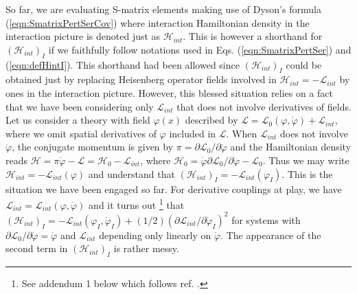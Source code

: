 
\indent

So far, we are evaluating S-matrix elements making use of Dyson's formula (\ref{eqn:SmatrixPertSerCov})
where interaction Hamiltonian density in the interaction picture is denoted just as $\mathcal{H}_{int}$.
This is however a shorthand for $(\mathcal{H}_{int})_I$ 
if we faithfully follow notations used in Eqs. (\ref{eqn:SmatrixPertSer}) and (\ref{eqn:defHintI}).
This shorthand had been allowed since $(\mathcal{H}_{int})_I$ 
could be obtained just by replacing Heisenberg operator fields involved in $\mathcal{H}_{int} = -\mathcal{L}_{int}$
by ones in the interaction picture.
However, this blessed situation relies on a fact that
we have been considering only $\mathcal{L}_{int}$
that does not involve derivatives of fields.
Let us consider
 a theory with field $\varphi (x)$ described by
$\mathcal{L} = \mathcal{L}_0 (\varphi, \dot{\varphi}) + \mathcal{L}_{int}$, where
we omit spatial derivatives of $\varphi$ included in $\mathcal{L}$.
When $\mathcal{L}_{int}$ does not involve $\dot{\varphi}$, 
the conjugate momentum is given by
$\pi = \partial \mathcal{L}_0 / \partial \dot{\varphi}$ and the Hamiltonian density reads
$\mathcal{H} = \pi \dot{\varphi} - \mathcal{L} = \mathcal{H}_0 - \mathcal{L}_{int}$, where
$\mathcal{H}_0 = \dot{\varphi} \partial \mathcal{L}_0 / \partial \dot{\varphi} - \mathcal{L}_0$.
Thus we may write $\mathcal{H}_{int} = -\mathcal{L}_{int} (\varphi)$ and
understand that $(\mathcal{H}_{int})_I =  -\mathcal{L}_{int} (\varphi_I)$.
This is the situation we have been engaged so far.
For derivative couplings at play, we have $\mathcal{L}_{int} = \mathcal{L}_{int} (\varphi, \dot{\varphi})$
and it turns out
\footnote{%
See addendum 1 below which follows ref. \cite{ref:NIsh.}.
}%
that
$(\mathcal{H}_{int})_I = -\mathcal{L}_{int} (\varphi_I, \dot{\varphi}_I)
+ (1/2)\left( \partial \mathcal{L}_{int} / \partial \dot{\varphi}_I \right)^2$ 
for systems with $\partial \mathcal{L}_0 / \partial \dot{\varphi} = \dot{\varphi}$
and $\mathcal{L}_{int}$ depending only linearly on $\dot{\varphi}$.
The appearance of the second term in $(\mathcal{H}_{int})_I$ is rather messy.


